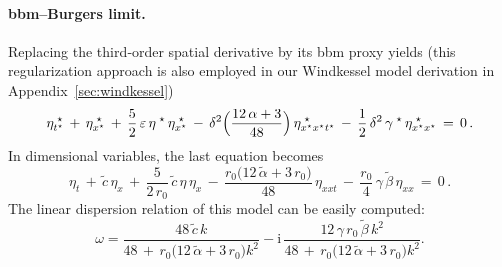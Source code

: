 \documentclass[alpha-refs, 12pt]{wiley-article}
\newcommand{\ui}{\mathrm{i}}
\newcommand{\eps}{\varepsilon}
\begin{document}
\paragraph{\acrshort{bbm}--Burgers limit.} Replacing the third‐order spatial derivative by its \acrshort{bbm} proxy yields (this regularization approach is also employed in our Windkessel model derivation in Appendix~\ref{sec:windkessel})
\begin{equation}\label{eq:5.11}
  \eta^{\;\star}_{t^{\star}}\,+\,\eta^{\;\star}_{x^{\star}}
  \,+\,\frac{5}{2}\,\eps\,\eta^{\;\star}\,\eta^{\;\star}_{x^{\star}}
  \,-\,\delta^{2}\Bigl(\frac{12\,\alpha+3}{48}\Bigr)\,\eta^{\;\star}_{x^{\star}x^{\star}t^{\star}}
  \,-\,\frac{1}{2}\,\delta^{2}\,\gamma^{\;\star}\,\eta^{\;\star}_{x^{\star}x^{\star}}\,=\,0\,.
\end{equation}
In dimensional variables, the last equation becomes
\begin{equation}\label{eq:BBMdim}
  \eta_{t}\,+\,\tilde{c}\,\eta_{x}
  \,+\,\frac{5}{2\,r_{0}}\,\tilde{c}\,\eta\,\eta_{x}
  \,-\,\frac{r_{0}\bigl(12\,\tilde{\alpha}+3\,r_{0}\bigr)}{48}\,\eta_{xxt}
  \,-\,\frac{r_{0}}{4}\,\gamma\,\tilde{\beta}\,\eta_{xx}\,=\,0\,.
\end{equation}
The linear dispersion relation of this model can be easily computed:
\begin{equation}
  \omega=\frac{48\,\tilde{c}\,k}{48\,+\,r_{0}\bigl(12\,\tilde{\alpha}+3\,r_{0}\bigr)k^{2}}
        -\ui\,\frac{12\,\gamma\,r_{0}\,\tilde{\beta}\,k^{2}}
                 {48\,+\,r_{0}\bigl(12\,\tilde{\alpha}+3\,r_{0}\bigr)k^{2}}.
\end{equation}
\end{document}
